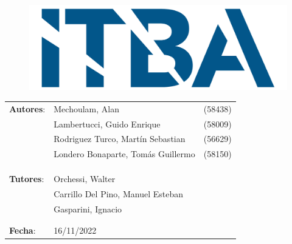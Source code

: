 \begin{titlepage}
\begin{figure}[H]
	\centering
	\includegraphics[width=0.5\linewidth]{./Utils/ITBA_2}
\end{figure}

\vspace*{1.5cm}

\center
{  }

\vspace*{1cm}

{ \textcolor{PName}{} }

\vspace*{3cm}

\begin{tabular}{llr} 	
\textbf{Autores}: & Mechoulam, Alan  &  (58438)\\
 & Lambertucci, Guido Enrique  & (58009) \\
 & Rodriguez Turco, Martín Sebastian  & (56629) \\
 & Londero Bonaparte, Tomás Guillermo  & (58150) \\
 &  & \\
 &  & \\
 &  & \\
\textbf{Tutores}: & Orchessi, Walter & \hspace*{4cm} \\
 & Carrillo Del Pino, Manuel Esteban & \hspace*{4cm} \\
 & Gasparini, Ignacio & \hspace*{4cm} \\
 &  & \\
 &  & \\
\textbf{Fecha}: & 16/11/2022 & \hspace*{4.5cm}\\
\end{tabular}

\end{titlepage}